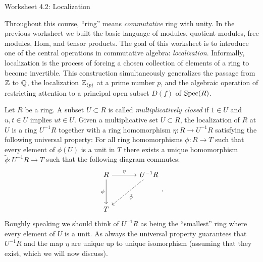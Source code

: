 \documentclass[Notebook.tex]{subfiles}
\begin{document}
\ifSubfilesClassLoaded{}{}
\begin{center}
    {Worksheet 4.2: Localization} 
\end{center}
Throughout this course, ``ring'' means \textit{commutative} ring with unity. In the previous worksheet we built the basic language of modules, quotient modules, free modules, Hom, and tensor products. The goal of this worksheet is to introduce one of the central operations in commutative algebra: \emph{localization}. Informally, localization is the process of forcing a chosen collection of elements of a ring to become invertible. This construction simultaneously generalizes the passage from $\mathbb Z$ to $\mathbb Q$, the localization $\mathbb Z_{\langle p\rangle}$ at a prime number $p$, and the algebraic operation of restricting attention to a principal open subset $D(f)$ of $\operatorname{Spec}(R)$.

Let $R$ be a ring. A subset $U \subset R$ is called \emph{multiplicatively closed} if $1\in U$ and $u,t\in U$ implies $ut\in U$. Given a multiplicative set $U \subset R$, the localization of $R$ at $U$ is a ring $U^{-1}R$ together with a ring homomorphism $\eta: R \to U^{-1}R$ satisfying the following universal property: For all ring homomorphisms $\phi:R \to T$ such that every element of $\phi(U)$ is a unit in $T$ there exists a unique homomorphism $\tilde{\phi}:U^{-1}R \to T$ such that the following diagram commutes:
\[
\begin{tikzcd}[row sep = 3.5em, column sep = 3.5em]
R \arrow[r, "\eta"] \arrow[d, swap, "\phi"] & U^{-1}R  \arrow[dl, dashed,"\tilde{\phi}"] \\
T & 
\end{tikzcd}.
\]
Roughly speaking we should think of $U^{-1}R$ as being the ``smallest'' ring where every element of $U$ is a unit.  As always the universal property guarantees that $U^{-1}R$ and the map $\eta$ are unique up to unique isomorphism (assuming that they exist, which we will now discuss). 
\end{document}

